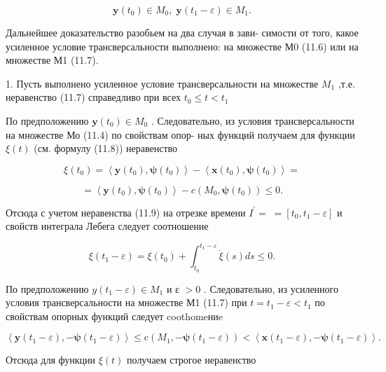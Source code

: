 \documentclass[8pt]{extarticle}
\begin{document}
\[
\mathbf{y}\left( {t}_{0}\right)  \in  {M}_{0},\;\mathbf{y}\left( {{t}_{1} - \varepsilon }\right)  \in  {M}_{1}. \tag{11.10}
\]

Дальнейшее доказательство разобьем на два случая в зави- симости от того, какое усиленное условие трансверсальности выполнено: на множестве М0 (11.6) или на множестве М1 (11.7).

1. Пусть выполнено усиленное условие трансверсальности на множестве \({M}_{1}\) ,т.е. неравенство (11.7) справедливо при всех \({t}_{0} \leq  t < {t}_{1}\)

По предположению \(\mathbf{y}\left( {t}_{0}\right)  \in  {M}_{0}\) . Следовательно, из условия трансверсальности на множестве Мо (11.4) по свойствам опор- ных функций получаем для функции \(\xi \left( t\right)\) (см. формулу (11.8)) неравенство

\[
\xi \left( {t}_{0}\right)  = \left\langle  {\mathbf{y}\left( {t}_{0}\right) ,\mathbf{\psi }\left( {t}_{0}\right) }\right\rangle   - \left\langle  {\mathbf{x}\left( {t}_{0}\right) ,\mathbf{\psi }\left( {t}_{0}\right) }\right\rangle   =
\]

\[
= \left\langle  {\mathbf{y}\left( {t}_{0}\right) ,\mathbf{\psi }\left( {t}_{0}\right) }\right\rangle   - c\left( {{M}_{0},\mathbf{\psi }\left( {t}_{0}\right) }\right)  \leq  0.
\]

Отсюда с учетом неравенства (11.9) на отрезке времени \({I}^{\prime } = \; = \left\lbrack  {{t}_{0},{t}_{1} - \varepsilon }\right\rbrack\) и свойств интеграла Лебега следует соотношение

\[
\xi \left( {{t}_{1} - \varepsilon }\right)  = \xi \left( {t}_{0}\right)  + {\int }_{{t}_{0}}^{{t}_{1} - \varepsilon }\dot{\xi }\left( s\right) {ds} \leq  0. \tag{11.11}
\]

По предположению \(y\left( {{t}_{1} - \varepsilon }\right)  \in  {M}_{1}\) и ε \(> 0\) . Следовательно, из усиленного условия трансверсальности на множестве М1 (11.7) при \(t = {t}_{1} - \varepsilon  < {t}_{1}\) по свойствам опорных функций следует coothomeниe

\[
\left\langle  {\mathbf{y}\left( {{t}_{1} - \varepsilon }\right) , - \mathbf{\psi }\left( {{t}_{1} - \varepsilon }\right) }\right\rangle   \leq  \mathrm{c}\left( {{M}_{1}, - \mathbf{\psi }\left( {{t}_{1} - \varepsilon }\right) }\right)  < \left\langle  {\mathbf{x}\left( {{t}_{1} - \varepsilon }\right) , - \mathbf{\psi }\left( {{t}_{1} - \varepsilon }\right) }\right\rangle  .
\]

Отсюда для функции \(\xi \left( t\right)\) получаем строгое неравенство
\end{document}

